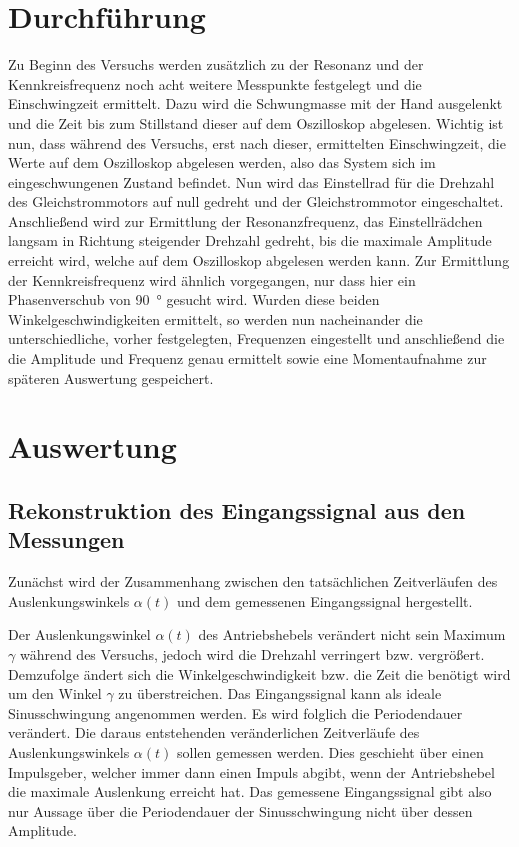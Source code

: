 \documentclass[a4paper,12pt]{scrartcl}
\begin{document}
\section{Durchführung}
Zu Beginn des Versuchs werden zusätzlich zu der Resonanz und der Kennkreisfrequenz noch acht weitere Messpunkte festgelegt und die Einschwingzeit ermittelt.
Dazu wird die Schwungmasse mit der Hand ausgelenkt und die Zeit bis zum Stillstand dieser auf dem Oszilloskop abgelesen. Wichtig ist nun, dass während des
Versuchs, erst nach dieser, ermittelten Einschwingzeit, die Werte auf dem Oszilloskop abgelesen werden, also das System sich im eingeschwungenen Zustand
befindet. Nun wird das Einstellrad für die Drehzahl des Gleichstrommotors auf null gedreht und der Gleichstrommotor eingeschaltet. Anschließend wird zur
Ermittlung der Resonanzfrequenz, das Einstellrädchen langsam in Richtung steigender Drehzahl gedreht, bis die maximale Amplitude erreicht wird, welche auf
dem Oszilloskop abgelesen werden kann. Zur Ermittlung der Kennkreisfrequenz wird ähnlich vorgegangen, nur dass hier ein Phasenverschub von  \SI{90}{\degree} gesucht wird.
Wurden diese beiden Winkelgeschwindigkeiten ermittelt, so werden nun nacheinander die unterschiedliche, vorher festgelegten, Frequenzen eingestellt und
anschließend die die Amplitude und Frequenz  genau ermittelt sowie eine Momentaufnahme zur späteren Auswertung gespeichert.
\section{Auswertung}

\subsection{Rekonstruktion des Eingangssignal aus den Messungen}

Zunächst wird der Zusammenhang zwischen den tatsächlichen Zeitverläufen des Auslenkungswinkels $\alpha \left( t \right)$ und dem gemessenen
Eingangssignal hergestellt.

Der Auslenkungswinkel $\alpha \left( t \right)$ des Antriebshebels verändert nicht sein Maximum $\gamma$ während des Versuchs, jedoch wird die Drehzahl
verringert bzw. vergrößert. Demzufolge ändert sich die Winkelgeschwindigkeit bzw. die Zeit die benötigt wird um den Winkel $\gamma$
zu überstreichen. Das Eingangssignal kann als ideale Sinusschwingung angenommen werden.
Es wird folglich die Periodendauer verändert. Die daraus entstehenden veränderlichen Zeitverläufe des Auslenkungswinkels $\alpha \left( t \right)$ sollen gemessen werden.
Dies geschieht über einen Impulsgeber, welcher immer dann einen Impuls abgibt, wenn der Antriebshebel die maximale Auslenkung erreicht hat.
Das gemessene Eingangssignal gibt also nur Aussage über die Periodendauer der Sinusschwingung nicht über dessen Amplitude.
\end{document}
